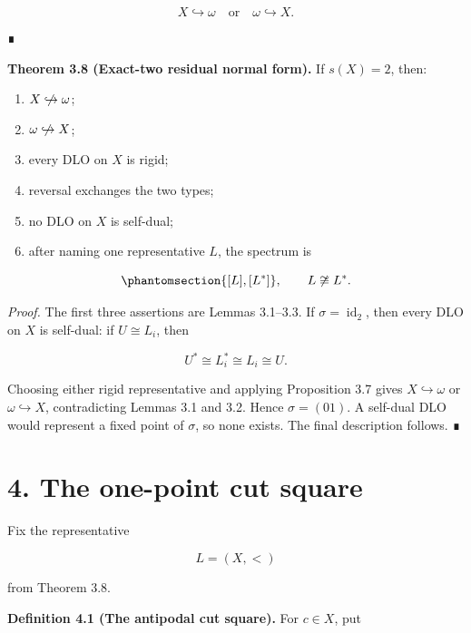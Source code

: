\documentclass[
  english,
  11pt,
  reqno]{amsart}
\newcounter{none} %
\providecommand{\tightlist}{%
  \setlength{\itemsep}{0pt}\setlength{\parskip}{0pt}}
\providecommand{\nhookrightarrow}{\centernot\hookrightarrow}
\begin{document}
\[
X\hookrightarrow\omega
\quad\text{or}\quad
\omega\hookrightarrow X.
\]

∎

\protect{}\label{thm:3-8-residual-normal-form}

\textbf{Theorem 3.8 (Exact-two residual normal form).} If \(s(X)=2\),
then:

\begin{enumerate}
\tightlist
\item
  \(X\nhookrightarrow\omega\);
\item
  \(\omega\nhookrightarrow X\);
\item
  every DLO on \(X\) is rigid;
\item
  reversal exchanges the two types;
\item
  no DLO on \(X\) is self-dual;
\item
  after naming one representative \(L\), the spectrum is
\end{enumerate}

\begin{equation}\protect\phantomsection\label{eq:exact-two-residual}{
   \{[L],[L^*]\},
   \qquad
   L\not\cong L^*.
}\end{equation}

\emph{Proof.} The first three assertions are Lemmas 3.1--3.3. If
\(\sigma=\operatorname{id}_2\), then every DLO on \(X\) is self-dual: if
\(U\cong L_i\), then

\[
U^*\cong L_i^*\cong L_i\cong U.
\]

Choosing either rigid representative and applying Proposition 3.7 gives
\(X\hookrightarrow\omega\) or \(\omega\hookrightarrow X\), contradicting
Lemmas 3.1 and 3.2. Hence \(\sigma=(01)\). A self-dual DLO would
represent a fixed point of \(\sigma\), so none exists. The final
description follows. ∎

\protect{}\label{sec:cut-square}

\section{4. The one-point cut square}\label{the-one-point-cut-square}

Fix the representative

\[
L=(X,<)
\]

from Theorem 3.8.

\protect{}\label{def:4-1-cut-square}

\textbf{Definition 4.1 (The antipodal cut square).} For \(c\in X\), put
\end{document}
